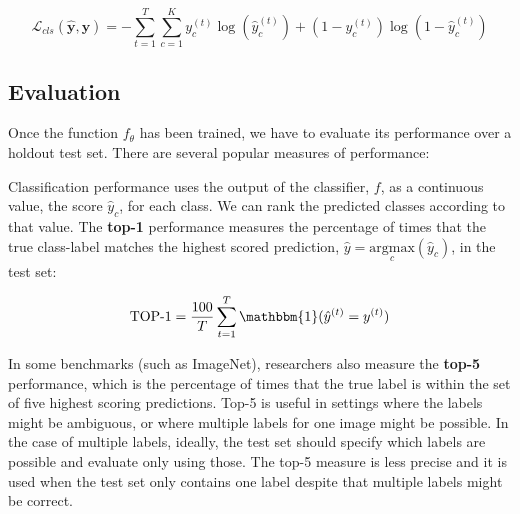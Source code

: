 \begin{equation}
    \mathcal{L}_{cls}(\hat{\mathbf{y}},\mathbf{y})
     = -\sum_{t=1}^{T} \sum_{c=1}^{K} y^{(t)}_c \log(\hat{y}^{(t)}_c)
     + 
     (1-y^{(t)}_c) \log(1-\hat{y}^{(t)}_c)
\end{equation}






\subsection{Evaluation}

Once the function $f_\theta$ has been trained, we have to evaluate its performance over a holdout test set. There are several popular measures of performance:

Classification performance uses the output of the classifier, $f$, as a continuous value, the score $\hat{y}_c$, for each class. We can rank the predicted classes according to that value. The {\bf top-1} performance measures the percentage of times that the true class-label matches the highest scored prediction, $\hat{y} = \underset{c}{\mathrm{argmax}} ( \hat{y}_c )$, in the test set: 

\begin{equation}
    \text{TOP-1} = \frac{100}{T}
    \sum_{t=1}^T \mathbbm{1}( \hat{y}^{(t)} = y^{(t)}) 
\end{equation}

In some benchmarks (such as ImageNet), researchers also measure the {\bf top-5} performance, which is the percentage of times that the true label is within the set of five highest scoring predictions. Top-5 is useful in settings where the labels might be ambiguous, or where multiple labels for one image might be possible. In the case of multiple labels, ideally, the test set should specify which labels are possible and evaluate only using those. The top-5 measure is less precise and it is used when the test set only contains one label despite that multiple labels might be correct. 

